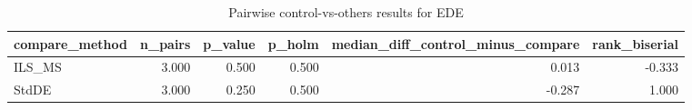 \begin{table}[!t]
\centering
\caption{Pairwise control-vs-others results for EDE}
\label{tab:posthoc_holm_generated}
\begin{tabular}{lrrrrr}
\toprule
compare_method & n_pairs & p_value & p_holm & median_diff_control_minus_compare & rank_biserial \\
\midrule
ILS_MS & 3.000 & 0.500 & 0.500 & 0.013 & -0.333 \\
StdDE & 3.000 & 0.250 & 0.500 & -0.287 & 1.000 \\
\bottomrule
\end{tabular}

\end{table}